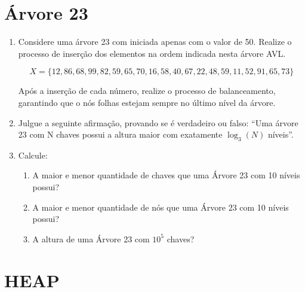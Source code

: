 \documentclass[12pt]{article}
\begin{document}
\section{Árvore 23}
\begin{enumerate}[resume,label=\textbf{Q\arabic*}]
    \item Considere uma árvore 23 com iniciada apenas com o valor de 50. Realize o processo de inserção dos elementos na ordem indicada nesta árvore AVL.\label{Q23_1}

          $$X = \{12,86,68,99,82,59,65,70,16,58,40,67,22,48,59,11,52,91,65,73\}$$

          Após a inserção de cada número, realize o processo de balanceamento, garantindo que o nós folhas estejam sempre no último nível da árvore.

    \item Julgue a seguinte afirmação, provando se é verdadeiro ou falso: ``Uma árvore 23 com N chaves possui a altura maior com exatamente $\log_3(N)$ níveis''.

    \item Calcule:
          \begin{enumerate}
              \item A maior e menor quantidade de chaves que uma Árvore 23 com 10 níveis possui?
              \item A maior e menor quantidade de nós que uma Árvore 23 com 10 níveis possui?
              \item A altura de uma Árvore 23 com $10^5$ chaves?
          \end{enumerate}
\end{enumerate}

\section{HEAP}
\end{document}
